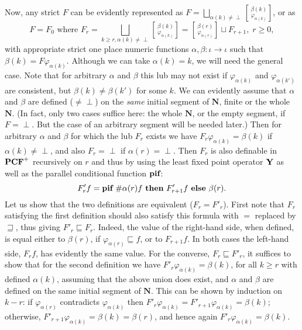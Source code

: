 \documentclass[fleqn]{LMCS}
\theoremstyle{plain}\newtheorem{satz}[thm]{Satz}
\theoremstyle{plain}\newtheorem{hyp}[thm]{Hypothesis}
\theoremstyle{plain}\newtheorem{hyps}[thm]{Hypotheses}
\theoremstyle{definition}\newtheorem{note}[thm]{Note}
\newcommand{\arr}{\rightarrow}
\newcommand{\NN}{\mathbf{N}}
\newcommand{\PCF}{\mbox{\bf PCF}}
\newcommand{\Y}{\mbox{\bf Y}}
\newcommand{\PIF}{\mbox{\bf pif}}
\newcommand{\THEN}{\mbox{\bf then}}
\newcommand{\ELSE}{\mbox{\bf else}}
\newcommand{\Undef}{{\perp}}
\newcommand{\?}{\mbox{?}}
\begin{document}
\begin{enumerate}[(a)]
Now, any strict $F$ can be evidently represented as   
$F=\bigsqcup_{\alpha(k)\ne\Undef}
\left[\,_{\varphi_{\alpha(k)}}^{\beta(k)}\right]$, or as 
\[
F=F_0\mbox{ where }
F_r=\bigsqcup_{k\ge r,\alpha(k)\ne\Undef}
\left[\,_{\varphi_{\alpha(k)}}^{\beta(k)}\right]
=
\left[\,_{\varphi_{\alpha(r)}}^{\beta(r)}\right]\sqcup F_{r+1}
,\; 
r\ge0,
\]
with appropriate strict one place numeric functions $\alpha,\beta:\iota\arr\iota$ 
such that $\beta(k)=F\varphi_{\alpha(k)}$. Although we can take $\alpha(k)=k$, 
we will need the general case. Note that for arbitrary $\alpha$ and $\beta$ 
this lub may not 
exist if $\varphi_{\alpha(k)}$ and $\varphi_{\alpha(k')}$ 
are consistent, but $\beta(k)\ne\beta(k')$ 
for some $k$. 
We can evidently assume that $\alpha$ and $\beta$ are 
defined (${}\ne\Undef$) on the \emph{same} 
initial segment of $\NN$, finite or the whole $\NN$. 
(In fact, only two cases suffice here: the whole $\NN$, or 
the empty segment, if $F=\Undef$. 
But the case of an arbitrary segment will be needed later.)
Then for arbitrary $\alpha$ and $\beta$ 
for which the lub $F_r$ exists
we have $F_r\varphi_{\alpha(k)}=\beta(k)$ if $\alpha(k)\ne\Undef$, 
and
also 
$F_r=\Undef$ if $\alpha(r)=\Undef$. 
Then $F_r$ is also definable 
in $\PCF^+$ recursively on $r$ and thus by using the least fixed point 
operator $\Y$ as well as 
the parallel conditional function $\PIF$: 
\[
F'_r f=
	\PIF\ \#\alpha(r)f\ \THEN\ F'_{r+1}f\ \ELSE\ \beta(r).
\]
Let us show that the two definitions are equivalent ($F_r = F'_r$). 
First note that 
$F_r$ satisfying the first definition should also satisfy this formula 
with $=$ replaced by $\sqsupseteq$, thus giving $F'_r \sqsubseteq F_r$. 
Indeed, the value of the right-hand side, when defined, is equal either to 
$\beta(r)$, if 
$\varphi_{\alpha(r)}\sqsubseteq f$, 
or to 
$F_{r+1}f$. 
In both cases the left-hand side, $F_r f$, has evidently the same value. 
For the converse, $F_r \sqsubseteq F'_r$, it suffices to show that 
for the second definition 
we have 
$F'_r\varphi_{\alpha(k)}=\beta(k)$, 
for all $k\ge r$ with defined $\alpha(k)$, 
assuming that the above union does exist, and $\alpha$ and $\beta$ are 
defined on the same initial segment of $\NN$. 
This can be shown by induction on $k-r$: 
if $\varphi_{\alpha(r)}$ contradicts $\varphi_{\alpha(k)}$ then 
$F'_r\varphi_{\alpha(k)}=F'_{r+1}\varphi_{\alpha(k)}=\beta(k)$; 
otherwise, $F'_{r+1}\varphi_{\alpha(k)}=\beta(k)=\beta(r)$, and hence again  
$F'_r\varphi_{\alpha(k)}=\beta(k)$. 



\end{enumerate}
\end{document}

